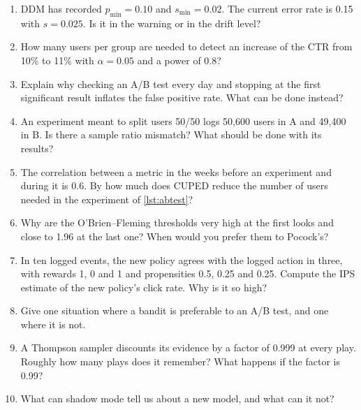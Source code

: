 \begin{enumerate}[label=\textbf{6.\arabic*},ref=6.\arabic*,leftmargin=*,itemsep=6pt]
        target to a source example. What is its importance weight? What is the effective sample size of five examples with weights 1,
        1, 1, 1 and 4?
  \item\label{exr6:ddm} DDM has recorded $p_{\min}=0.10$ and $s_{\min}=0.02$. The current error rate is 0.15 with $s=0.025$. Is it in the
        warning or in the drift level?
  \item\label{exr6:size} How many users per group are needed to detect an increase of the CTR from 10\% to 11\% with $\alpha=0.05$ and a
        power of 0.8?
  \item\label{exr6:peek} Explain why checking an A/B test every day and stopping at the first significant result inflates the false
        positive rate. What can be done instead?
  \item\label{exr6:srm} An experiment meant to split users 50/50 logs 50,600 users in A and 49,400 in B. Is there a sample ratio mismatch?
        What should be done with its results?
  \item\label{exr6:cuped} The correlation between a metric in the weeks before an experiment and during it is 0.6. By how much does CUPED
        reduce the number of users needed in the experiment of \cref{lst:abtest}?
  \item\label{exr6:obf} Why are the O'Brien--Fleming thresholds very high at the first looks and close to 1.96 at the last one? When would you
        prefer them to Pocock's?
  \item\label{exr6:ips} In ten logged events, the new policy agrees with the logged action in three, with rewards 1, 0 and 1 and propensities
        0.5, 0.25 and 0.25. Compute the IPS estimate of the new policy's click rate. Why is it so high?
  \item\label{exr6:bandit} Give one situation where a bandit is preferable to an A/B test, and one where it is not.
  \item\label{exr6:discount} A Thompson sampler discounts its evidence by a factor of 0.999 at every play. Roughly how many plays does it
        remember? What happens if the factor is 0.99?
  \item\label{exr6:shadow} What can shadow mode tell us about a new model, and what can it not?

\end{enumerate}
